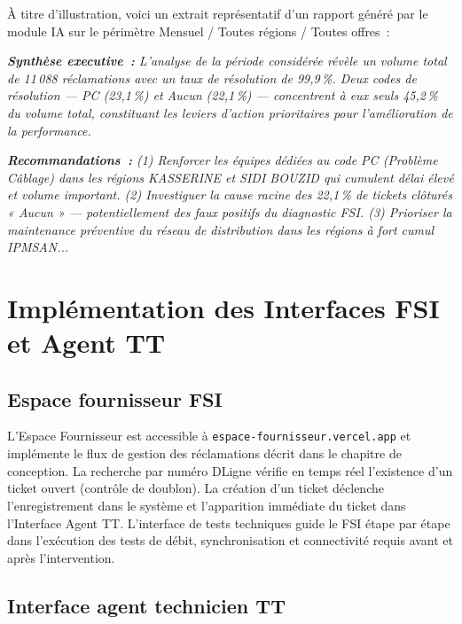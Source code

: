 \documentclass[10pt,a4paper]{report}
\begin{document}
À titre d'illustration, voici un extrait représentatif d'un rapport généré par le module IA sur le périmètre Mensuel / Toutes régions / Toutes offres~:

\begin{tcolorbox}[insightbox, title=Extrait --- Rapport Pareto Intelligent (généré par Llama 3.3 70B / Groq)]
\textit{\small\textbf{Synthèse executive~:} L'analyse de la période considérée révèle un volume total de 11\,088 réclamations avec un taux de résolution de 99,9\,\%. Deux codes de résolution --- PC (23,1\,\%) et Aucun (22,1\,\%) --- concentrent à eux seuls 45,2\,\% du volume total, constituant les leviers d'action prioritaires pour l'amélioration de la performance.}

\medskip
\textit{\small\textbf{Recommandations~:} (1) Renforcer les équipes dédiées au code PC (Problème Câblage) dans les régions KASSERINE et SIDI BOUZID qui cumulent délai élevé et volume important. (2) Investiguer la cause racine des 22,1\,\% de tickets clôturés « Aucun » --- potentiellement des faux positifs du diagnostic FSI. (3) Prioriser la maintenance préventive du réseau de distribution dans les régions à fort cumul IPMSAN...}
\end{tcolorbox}

\section{Implémentation des Interfaces FSI et Agent TT}

\subsection{Espace fournisseur FSI}

L'Espace Fournisseur est accessible à \texttt{espace-fournisseur.vercel.app} et implémente le flux de gestion des réclamations décrit dans le chapitre de conception. La recherche par numéro DLigne vérifie en temps réel l'existence d'un ticket ouvert (contrôle de doublon). La création d'un ticket déclenche l'enregistrement dans le système et l'apparition immédiate du ticket dans l'Interface Agent TT. L'interface de tests techniques guide le FSI étape par étape dans l'exécution des tests de débit, synchronisation et connectivité requis avant et après l'intervention.

\subsection{Interface agent technicien TT}
\end{document}
